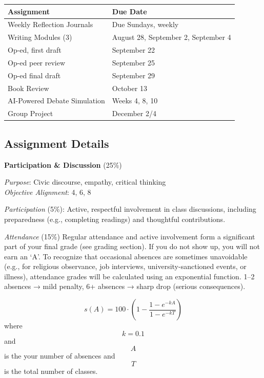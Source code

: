 \documentclass[]{tufte-handout}
\begin{document}
\begin{longtable}[]{@{}ll@{}}
\toprule()
Assignment & Due Date \\
\midrule()
\endhead
Weekly Reflection Journals & Due Sundays, weekly \\
Writing Modules (3) & August 28, September 2, September 4 \\
Op-ed, first draft & September 22 \\
Op-ed peer review & September 25 \\
Op-ed final draft & September 29 \\
Book Review & October 13 \\
AI-Powered Debate Simulation & Weeks 4, 8, 10 \\
Group Project & December 2/4 \\
\bottomrule()
\end{longtable}

\hypertarget{assignment-details}{%
\subsection{Assignment Details}\label{assignment-details}}

\textbf{Participation \& Discussion} (25\%)

\emph{Purpose}: Civic discourse, empathy, critical thinking\\
\emph{Objective Alignment}: 4, 6, 8

\emph{Participation} (5\%): Active, respectful involvement in class
discussions, including preparedness (e.g., completing readings) and
thoughtful contributions.

\emph{Attendance} (15\%) Regular attendance and active involvement form
a significant part of your final grade (see grading section). If you do
not show up, you will not earn an `A'. To recognize that occasional
absences are sometimes unavoidable (e.g., for religious observance, job
interviews, university-sanctioned events, or illness), attendance grades
will be calculated using an exponential function. 1--2 absences → mild
penalty, 6+ absences → sharp drop (serious consequences).

\[s(A) = 100 \cdot \left(1 - \frac{1 - e^{-kA}}{1 - e^{-kT}} \right)\]
where \[k=0.1\] and \[A\] is the your number of absences and \[T\] is
the total number of classes.
\end{document}
